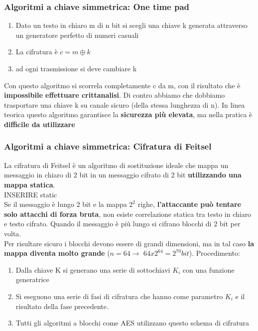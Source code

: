 \documentclass[12pt]{article}
\begin{document}
 		\subsubsection{Algoritmi a chiave simmetrica: One time pad}
 			\begin{enumerate}
 				\item Dato un testo in chiaro m di n bit si scegli una chiave k generata attraverso un generatore perfetto di numeri casuali
 				\item La cifratura è $c=m\oplus k$
 				\item ad ogni trasmissione si deve cambiare k
 			\end{enumerate}
 			Con questo algoritmo si scorrela completamente c da m, con il risultato che è \textbf{impossibile effettuare crittanalisi}. Di contro abbiamo che dobbiamo trasportare una chiave k su canale sicuro (della stessa lunghezza di n). In linea teorica questo algoritmo garantisce la \textbf{sicurezza più elevata}, ma nella pratica è \textbf{difficile da utilizzare}
 			
 		\subsubsection{Algoritmi a chiave simmetrica: Cifratura di Feitsel}
 			La cifratura di Feitsel è un algoritmo di sostituzione ideale che mappa un messaggio in chiaro di 2 bit in un messaggio cifrato di 2 bit \textbf{utilizzando una mappa statica}.\\
 			
 			INSERIRE static\\
 			
 			Se il messaggio è lungo 2 bit e la mappa $2^{2}$ righe, \textbf{l'attaccante può tentare solo attacchi di forza bruta}, non esiste correlazione statica tra testo in chiaro e testo cifrato. Quando il messaggio è più lungo si cifrano blocchi di 2 bit per volta.\\
 			Per risultare sicuro i blocchi devono essere di grandi dimensioni, ma in tal caso \textbf{la mappa diventa molto grande} ($n=64 \rightarrow$ $64x2^{64} = 2^{70} bit$). Procedimento:
 			\begin{enumerate}
 				\item Dalla chiave K si generano una serie di sottochiavi $K_{i}$ con una funzione generatrice
 				\item Si eseguono una serie di fasi di cifratura che hanno come parametro $K_{i}$ e il risultato della fase precedente.
 				\item Tutti gli algoritmi a blocchi come AES utilizzano questo schema di cifratura
 			\end{enumerate}
			
\end{document}
